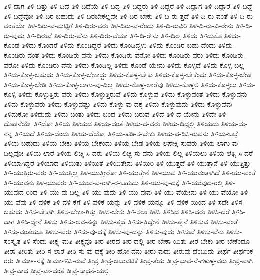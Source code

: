 {ತಿಳಿ-ದಾಗ
ತಿಳಿ-ದಿತ್ತು
ತಿಳಿ-ದಿದೆ
ತಿಳಿ-ದಿದೆಯೆ
ತಿಳಿ-ದಿದ್ದ
ತಿಳಿ-ದಿದ್ದರು
ತಿಳಿ-ದಿದ್ದರೆ
ತಿಳಿ-ದಿದ್ದಾಗ
ತಿಳಿ-ದಿದ್ದಾರೆ
ತಿಳಿ-ದಿದ್ದೆ
ತಿಳಿ-ದಿದ್ದೆವೋ
ತಿಳಿ-ದಿರ-ಬಹುದು
ತಿಳಿ-ದಿರಬೇಕಲ್ಲವೇ
ತಿಳಿ-ದಿರ-ಬೇಕು
ತಿಳಿ-ದಿ-ರು-ತ್ತದೆ
ತಿಳಿ-ದಿ-ರು-ವಂತೆ
ತಿಳಿ-ದಿ-ರು-ವಂತೆಯೇ
ತಿಳಿ-ದಿರು-ವ-ಮಟ್ಟಿಗೆ
ತಿಳಿ-ದಿರು-ವರು
ತಿಳಿ-ದಿರು-ವ-ರೆಂದು
ತಿಳಿ-ದಿ-ರುವಿರಿ
ತಿಳಿ-ದಿ-ರು-ವಿ-ರೇನು
ತಿಳಿ-ದಿ-ರು-ವುದು
ತಿಳಿ-ದಿರುವೆ
ತಿಳಿ-ದಿರು-ವೆನು
ತಿಳಿ-ದಿರು-ವೆಯಾ
ತಿಳಿ-ದಿ-ರೇನು
ತಿಳಿ-ದಿಲ್ಲ
ತಿಳಿದು
ತಿಳಿದುಕೊ
ತಿಳಿದು-ಕೊಂಡ
ತಿಳಿದು-ಕೊಂಡರೆ
ತಿಳಿದು-ಕೊಂಡಿದ್ದರೆ
ತಿಳಿದು-ಕೊಂಡಿದ್ದಳು
ತಿಳಿದು-ಕೊಂಡಿರ-ಬಹು-ದೆಂದು
ತಿಳಿದು-ಕೊಂಡಿರು-ವಂತೆ
ತಿಳಿದು-ಕೊಂಡಿರು-ವನು
ತಿಳಿದು-ಕೊಂಡಿರು-ವನೋ
ತಿಳಿದು-ಕೊಂಡಿರು-ವರು
ತಿಳಿದು-ಕೊಂಡಿರು-ವರೋ
ತಿಳಿದು-ಕೊಂಡಿರು-ವೆನು
ತಿಳಿದು-ಕೊಂಡಿಲ್ಲ
ತಿಳಿದು-ಕೊಂಡೆ-ಯೇನು
ತಿಳಿದು-ಕೊಳ್ಳದೆ
ತಿಳಿದು-ಕೊಳ್ಳ-ಬಲ್ಲ
ತಿಳಿದು-ಕೊಳ್ಳ-ಬಹುದು
ತಿಳಿದು-ಕೊಳ್ಳ-ಬೇಕಾದ್ದು
ತಿಳಿದು-ಕೊಳ್ಳ-ಬೇಕು
ತಿಳಿದು-ಕೊಳ್ಳ-ಬೇಕೆಂದು
ತಿಳಿದು-ಕೊಳ್ಳ-ಬೇಡ
ತಿಳಿದು-ಕೊಳ್ಳ-ಬೇಡಿ
ತಿಳಿದು-ಕೊಳ್ಳ-ಲಾಗು-ವು-ದಿಲ್ಲ
ತಿಳಿದು-ಕೊಳ್ಳ-ಲಾರೆವು
ತಿಳಿದು-ಕೊಳ್ಳಲಿ
ತಿಳಿದು-ಕೊಳ್ಳಲು
ತಿಳಿದು-ಕೊಳ್ಳಿ
ತಿಳಿದು-ಕೊಳ್ಳುತ್ತಿರು-ವರು
ತಿಳಿದು-ಕೊಳ್ಳುತ್ತಿರುವೆ
ತಿಳಿದು-ಕೊಳ್ಳುವ
ತಿಳಿದು-ಕೊಳ್ಳುವಂತೆ
ತಿಳಿದು-ಕೊಳ್ಳುವನು
ತಿಳಿದು-ಕೊಳ್ಳುವರು
ತಿಳಿದು-ಕೊಳ್ಳುವಷ್ಟು
ತಿಳಿದು-ಕೊಳ್ಳು-ವು-ದಕ್ಕೆ
ತಿಳಿದು-ಕೊಳ್ಳುವುದು
ತಿಳಿದು-ಕೊಳ್ಳುವೆವು
ತಿಳಿದುಕೋ
ತಿಳಿದುದು
ತಿಳಿದು-ಬಂತು
ತಿಳಿದು-ಬಂದ
ತಿಳಿದು-ಬರುವ
ತಿಳಿದೆ
ತಿಳಿ-ದೆ-ಯೇನು
ತಿಳಿದೇ
ತಿಳಿ-ದೊಡನೆಯೇ
ತಿಳಿದೋ
ತಿಳಿಯ
ತಿಳಿಯದ
ತಿಳಿಯ-ದಂತೆ
ತಿಳಿಯ-ದ-ವರು
ತಿಳಿಯ-ದಿದ್ದಲ್ಲಿ
ತಿಳಿಯದು
ತಿಳಿಯ-ದು-ನನ್ನ
ತಿಳಿಯದೆ
ತಿಳಿಯ-ದೆಂದು
ತಿಳಿಯ-ದೆಯೋ
ತಿಳಿಯ-ಪಡಿ-ಸ-ಬೇಕು
ತಿಳಿಯ-ಪ-ಡಿಸಿ-ರುವನು
ತಿಳಿಯ-ಬಲ್ಲೆ
ತಿಳಿಯ-ಬಹುದು
ತಿಳಿಯ-ಬೇಕು
ತಿಳಿಯ-ಬೇಕೆಂದು
ತಿಳಿಯ-ಬೇಡ
ತಿಳಿಯ-ಲಪೇಕ್ಷಿ-ಸುವರು
ತಿಳಿಯ-ಲಾಗು-ವು-ದಿಲ್ಲವೋ
ತಿಳಿಯ-ಲಾರೆ
ತಿಳಿಯ-ಲಿಚ್ಚಿ-ಸಿ-ದರು
ತಿಳಿಯ-ಲಿಚ್ಛಿ-ಸು-ವನು
ತಿಳಿಯ-ಲಿಲ್ಲ
ತಿಳಿಯಲು
ತಿಳಿಯ-ಲೆತ್ನಿ-ಸಿ-ದರೆ
ತಿಳಿಯಾಗಿದ್ದರೆ
ತಿಳಿಯಾದ
ತಿಳಿಯಿತು
ತಿಳಿಯಿತೆ
ತಿಳಿಯಿತೇನು
ತಿಳಿಯಿರಿ
ತಿಳಿ-ಯುತ್ತದೆ
ತಿಳಿ-ಯುತ್ತಾನೆ
ತಿಳಿ-ಯುತ್ತಿತ್ತು
ತಿಳಿ-ಯುತ್ತಿರು-ವರು
ತಿಳಿ-ಯುತ್ತಿಲ್ಲ
ತಿಳಿ-ಯುತ್ತೀರೋ
ತಿಳಿ-ಯುತ್ತೇನೆ
ತಿಳಿ-ಯುವ
ತಿಳಿ-ಯುವಂತಾಗಿದೆ
ತಿಳಿ-ಯು-ವಂತೆ
ತಿಳಿ-ಯುವನು
ತಿಳಿ-ಯುವರು
ತಿಳಿ-ಯುವ-ವ-ರಾಗಿ-ರ-ಬಹುದು
ತಿಳಿ-ಯು-ವು-ದಕ್ಕೆ
ತಿಳಿ-ಯುವುದ-ರಲ್ಲಿ
ತಿಳಿ-ಯುವುದ-ರಿಂದ
ತಿಳಿ-ಯು-ವು-ದಿಲ್ಲ
ತಿಳಿ-ಯು-ವುದು
ತಿಳಿ-ಯು-ವುವು
ತಿಳಿ-ಯು-ವೆಯೇನು
ತಿಳಿ-ಯು-ವೆಯೋ
ತಿಳಿ-ಯು-ವೆವು
ತಿಳಿ-ವಳಿಕೆ
ತಿಳಿ-ವಳಿ-ಕೆಗೆ
ತಿಳಿ-ವಳಿಕೆ-ಯನ್ನು
ತಿಳಿ-ವಳಿಕೆ-ಯನ್ನೂ
ತಿಳಿ-ವಳಿಕೆ-ಯಿಂದ
ತಿಳಿ-ಸದೇ
ತಿಳಿಸ-ಬಹುದು
ತಿಳಿಸ-ಬೇಕಾಗಿ
ತಿಳಿಸ-ಬೇಕಾ-ಗಿತ್ತು
ತಿಳಿಸ-ಬೇಕು
ತಿಳಿ-ಸಲು
ತಿಳಿಸಿ
ತಿಳಿಸಿದ
ತಿಳಿಸಿ-ದರು
ತಿಳಿಸಿ-ದರೆ
ತಿಳಿಸಿ-ದಾಗ
ತಿಳಿಸಿ-ದ್ದೇನೆ
ತಿಳಿಸು
ತಿಳಿಸು-ಅವ-ನನ್ನು
ತಿಳಿಸು-ತ್ತದೆ
ತಿಳಿಸು-ತ್ತಿದ್ದೇನೆ
ತಿಳಿಸು-ತ್ತೇನೆ
ತಿಳಿಸುವ
ತಿಳಿಸು-ವಂತೆ
ತಿಳಿಸು-ವಂತೆಯೂ
ತಿಳಿಸು-ವರು
ತಿಳಿಸು-ವು-ದಕ್ಕೆ
ತಿಳಿಸು-ವು-ದನ್ನು
ತಿಳಿಸು-ವುದು
ತಿಳಿಸುವೆ
ತಿಳಿಸು-ವೆನು
ತಿಳಿಸು-ಸಂಸ್ಕೃತ
ತಿಳಿ-ಸೆಂದು
ತೀಕ್ಷ್ಣ-ಮತಿ
ತೀಕ್ಷ್ಣವೂ
ತೀರ
ತೀರದ
ತೀರ-ದಲ್ಲಿ
ತೀರ-ಬೇಕಾ-ಯಿತು
ತೀರ-ಬೇಕು
ತೀರ-ಬೇಕೆಂದೂ
ತೀರಾ
ತೀರಿತು
ತೀರಿ-ಸ-ಲಾರೆ
ತೀರಿ-ಸು-ವು-ದಕ್ಕೆ
ತೀರಿ-ಹೋ-ದನು
ತೀರು-ವುದು
ತೀರುವು-ದೆಂಬುದು
ತೀರ್ಥ
ತೀರ್ಥಂಕ-ರರು
ತೀರ್ಮಾ-ನಕ್ಕೆ
ತೀರ್ಮಾನಿಸಿ-ರುವೆ
ತೀವ್ರ
ತೀವ್ರ-ಚಟುವಟಿಕೆ
ತೀವ್ರ-ತೆಯ
ತೀವ್ರ-ಭಾವ-ನೆ-ಗಳುಳ್ಳ-ವರು
ತೀವ್ರ-ವಾಗಿ
ತೀವ್ರ-ವಾದ
ತೀವ್ರ-ವಾ-ದಂತೆ
ತೀವ್ರ-ಸಾಧನೆ-ಯಲ್ಲಿ
}

